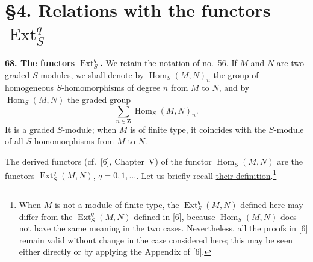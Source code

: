 
\label{fac:III:4}
\section*{\S4. Relations with the functors $\operatorname{Ext}_S^q$}

\label{fac:III:4:no:68}
\textbf{68. The functors $\operatorname{Ext}_S^q$.}
We retain the notation of \hyperref[fac:III:2:no:56]{no.~56}. If $M$ and
$N$ are two graded $S$-modules, we shall denote by
$\operatorname{Hom}_S(M,N)_n$ the group of homogeneous $S$-homomorphisms
of degree $n$ from $M$ to $N$, and by $\operatorname{Hom}_S(M,N)$ the
graded group
\label{fac:III:4:no:68:def:graded-hom}
\[
\sum_{n\in\mathbf{Z}}\operatorname{Hom}_S(M,N)_n.
\]
It is a graded $S$-module; when $M$ is of finite type, it coincides with
the $S$-module of all $S$-homomorphisms from $M$ to $N$.

The derived functors (cf.~[6], Chapter~V) of the functor
$\operatorname{Hom}_S(M,N)$ are the functors
$\operatorname{Ext}_S^q(M,N)$, $q=0,1,\ldots$. Let us briefly recall
\hyperref[fac:III:4:no:68:construction:Ext]{their definition}.\footnote{When
$M$ is not a module of finite type, the
$\operatorname{Ext}_S^q(M,N)$ defined here may differ from the
$\operatorname{Ext}_S^q(M,N)$ defined in [6], because
$\operatorname{Hom}_S(M,N)$ does not have the same meaning in the two
cases. Nevertheless, all the proofs in [6] remain valid without change
in the case considered here; this may be seen either directly or by
applying the Appendix of [6].}

